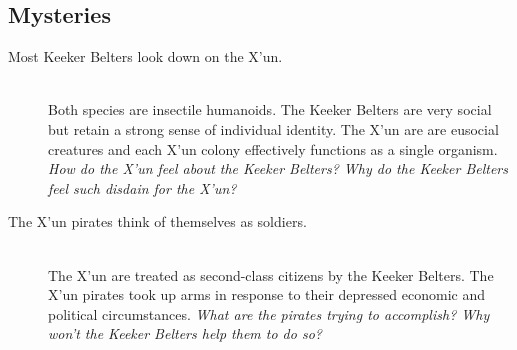 \documentclass[11pt, a5paper, parskip=half-, DIV=12]{scrartcl}
\begin{document}
\subsection*{Mysteries}
\begin{description}
	\item[Most Keeker Belters look down on the X'un.] \phantom{a} \\ Both species are insectile humanoids. The Keeker Belters are very social but retain a strong sense of individual identity. The X'un are are eusocial creatures and each X'un colony effectively functions as a single organism. \textit{How do the X'un feel about the Keeker Belters? Why do the Keeker Belters feel such disdain for the X'un? }
	\item[The X'un pirates think of themselves as soldiers.] \phantom{a} \\ The X'un are treated as second-class citizens by the Keeker Belters. The X'un pirates took up arms in response to their depressed economic and political circumstances. \textit{What are the pirates trying to accomplish? Why won't the Keeker Belters help them to do so?}
\end{description}

\newpage


\end{document}
